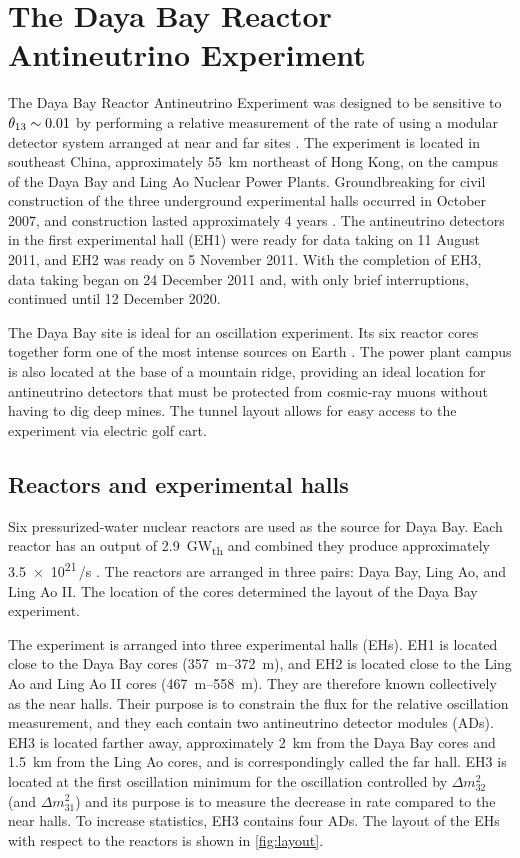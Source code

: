 \chapter{The Daya Bay Reactor Antineutrino Experiment}
\label{ch:detector}

The Daya Bay Reactor Antineutrino Experiment was designed
to be sensitive to $\theta_{13} \sim 0.01$
by performing a relative measurement of the rate of \nuebar{}
using a modular detector system arranged at near and far sites \cite{dybproposal2006}.
The experiment is located in southeast China,
approximately \SI{55}{\km} northeast of Hong Kong,
on the campus of the Daya Bay and Ling Ao Nuclear Power Plants.
Groundbreaking for civil construction of the three underground
experimental halls occurred in October 2007,
and construction lasted approximately 4 years \cite{dyb_overview}.
The antineutrino detectors in the first experimental hall (EH1)
were ready for data taking on 11 August 2011,
and EH2 was ready on 5 November 2011.
With the completion of EH3, data taking began on 24 December 2011
and, with only brief interruptions,
continued until 12 December 2020.

The Daya Bay site is ideal for an oscillation experiment.
Its six reactor cores together form one of the most intense \nuebar{}
sources on Earth \cite{detector_system}.
The power plant campus is also located at the base of a mountain ridge,
providing an ideal location for antineutrino detectors that must be
protected from cosmic-ray muons without having to dig deep mines.
The tunnel layout allows for easy access to the experiment via electric golf cart.

\section{Reactors and experimental halls}

Six pressurized-water nuclear reactors are used
as the \nuebar{} source for Daya Bay.
Each reactor has an output of \SI{2.9}{\giga\watt_{th}}
and combined they produce approximately \num{3.5e21}\,\nuebar/s \cite{ngd2016}.
The reactors are arranged in three pairs: Daya Bay, Ling Ao, and Ling Ao II.
The location of the cores determined the layout of the Daya Bay experiment.

The experiment is arranged into three experimental halls (EHs).
EH1 is located close to the Daya Bay cores (\SIrange{357}{372}{\meter}),
and EH2 is located close to the Ling Ao and Ling Ao II cores
(\SIrange{467}{558}{\meter}).
They are therefore known collectively as the near halls.
Their purpose is to constrain the \nuebar{} flux for the
relative oscillation measurement,
and they each contain two antineutrino detector modules (ADs).
EH3 is located farther away, approximately \SI{2}{\km} from the Daya Bay cores
and \SI{1.5}{\km} from the Ling Ao cores,
and is correspondingly called the far hall.
EH3 is located at the first oscillation minimum
for the oscillation controlled by $\Delta m^2_{32}$ (and $\Delta m^2_{31}$)
and its purpose is to measure the decrease in \nuebar{} rate compared to the near halls.
To increase statistics, EH3 contains four ADs.
The layout of the EHs with respect to the reactors is shown in \cref{fig:layout}.

